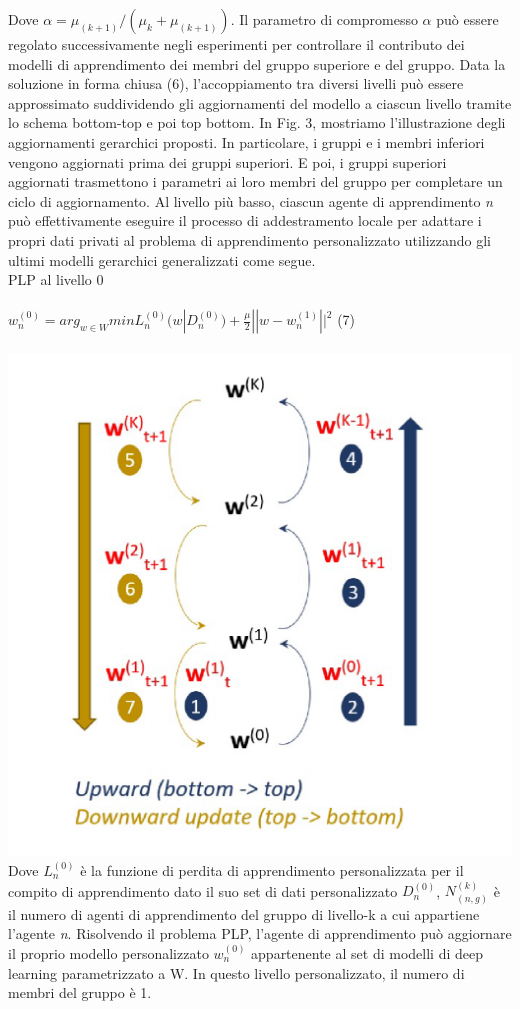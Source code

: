 \begin{itemize}
Dove $\alpha=\mu_{(k+1)}/(\mu_k+\mu_{(k+1)})$. Il parametro di compromesso $\alpha$ può essere regolato successivamente negli esperimenti per controllare il contributo dei modelli di apprendimento dei membri del gruppo superiore e del gruppo. Data la soluzione in forma chiusa (6), l'accoppiamento tra diversi livelli
può essere approssimato suddividendo gli aggiornamenti del modello a ciascun livello tramite lo schema bottom-top e poi top bottom. In Fig. 3, mostriamo l'illustrazione degli aggiornamenti gerarchici proposti. In particolare, i gruppi e i membri inferiori vengono aggiornati prima dei gruppi superiori. E poi, i gruppi superiori aggiornati trasmettono i parametri ai loro membri del gruppo per completare un ciclo di aggiornamento.
Al livello più basso, ciascun agente di apprendimento \textsl{n} può effettivamente eseguire il processo di addestramento locale per adattare i propri dati privati al problema di apprendimento personalizzato utilizzando gli ultimi modelli gerarchici generalizzati come segue.\\
PLP al livello 0\\\\
$w_n^{(0)}=arg_{w\in W}min L_n^{(0)}(w|D_n^{(0)})+\frac{\mu}{2}||w-w_n^{(1)}||^2$\hspace{1cm} (7)\\\\
\includegraphics[scale=0.3]{BottomUPDOWN}\\
Dove $L_n^{(0)}$  è la funzione di perdita di apprendimento personalizzata per il compito di apprendimento dato il suo set di dati personalizzato $D_n^{(0)}$, $N_{(n,g)}^{(k)}$ è il numero di agenti di apprendimento del gruppo di livello-k a cui appartiene l'agente \textsl{n}.
Risolvendo il problema PLP, l'agente di apprendimento può aggiornare il proprio modello personalizzato $w_n^{(0)}$ appartenente al set di modelli di deep learning parametrizzato a W. In questo livello personalizzato, il numero di membri del gruppo è 1.


\end{itemize}
